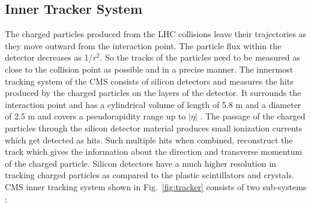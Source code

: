 \subsection{Inner Tracker System}
The charged particles produced from the LHC collisions leave their trajectories as they move outward from the interaction point. The particle flux within the detector decreases as 1/$r^2$. So the tracks of the particles need to be measured as close to the collision point as possible and in a precise manner. The innermost tracking system of the CMS consists of silicon detectors and measures the hits produced by the charged particles on the layers of the detector. It surrounds the interaction point and has a cylindrical volume of length of 5.8 m and a diameter of 2.5 m and covers a pseudorapidity range up to $|\eta|$ . The passage of the charged particles through the silicon detector material produces small ionization currents which get detected as hits. Such multiple hits when combined, reconstruct the track which gives the information about the direction and transverse momentum \pt of the charged particle. Silicon detectors have a much higher resolution in tracking charged particles as compared to the plastic scintillators and crystals. CMS inner tracking system shown in Fig.~\ref{fig:tracker} consists of two sub-systems :\\ \newline 
